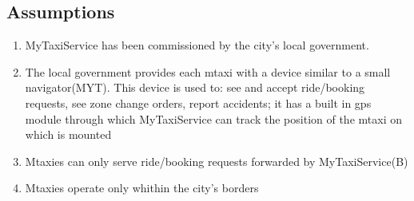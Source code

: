 \documentclass[11pt,titlepage]{article} %
\begin{document}
  \subsection{Assumptions}
	\begin{enumerate}
	    \item MyTaxiService has been commissioned by the city's local government.
	
	    \item The local government provides each mtaxi with a device similar to a small navigator(MYT). This device is used
	      to: see and accept ride/booking requests, see zone change orders, report accidents; it has a built in gps module through which MyTaxiService can
	      track the position of the mtaxi on which is mounted
	
	    \item Mtaxies can only serve ride/booking requests forwarded by MyTaxiService(B)
	
	    \item Mtaxies operate only whithin the city's borders
	\end{enumerate}
\end{document}
